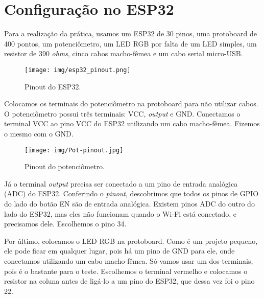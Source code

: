 \section{Configuração no ESP32}

Para a realização da prática, usamos um ESP32 de 30 pinos, uma protoboard de 400 pontos, um potenciômetro, um LED RGB por falta de um LED simples, um resistor de 390 \textit{ohms}, cinco cabos macho-fêmea e um cabo serial micro-USB.

\begin{figure}[H]
    \centering
    \texttt{[image: img/esp32\_pinout.png]}
    \caption{Pinout do ESP32.}
    \label{fig:esp32-pinout}
\end{figure}

Colocamos os terminais do potenciômetro na protoboard para não utilizar cabos. O potenciômetro possui três terminais: VCC, \textit{output} e GND. Conectamos o terminal VCC ao pino VCC do ESP32 utilizando um cabo macho-fêmea. Fizemos o mesmo com o GND. 

\begin{figure}[H]
    \centering
    \texttt{[image: img/Pot-pinout.jpg]}
    \caption{Pinout do potenciômetro.}
    \label{fig:pot-pinout}
\end{figure}

Já o terminal \textit{output} precisa ser conectado a um pino de entrada analógica (ADC) do ESP32. Conferindo o \textit{pinout}, descobrimos que todos os pinos de GPIO do lado do botão EN são de entrada analógica. Existem pinos ADC do outro do lado do ESP32, mas eles não funcionam quando o Wi-Fi está conectado, e precisamos dele. Escolhemos o pino 34.

Por último, colocamos o LED RGB na protoboard. Como é um projeto pequeno, ele pode ficar em qualquer lugar, pois há um pino de GND para ele, onde conectamos utilizando um cabo macho-fêmea. Só vamos usar um dos terminais, pois é o bastante para o teste. Escolhemos o terminal vermelho e colocamos o resistor na coluna antes de ligá-lo a um pino do ESP32, que dessa vez foi o pino 22.